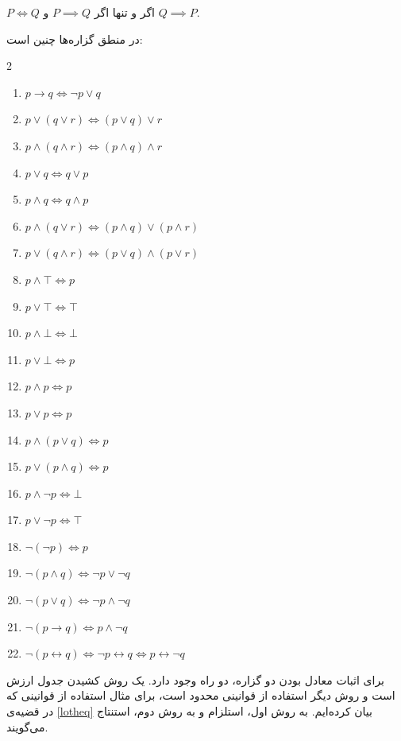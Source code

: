 \begin{theorem}
	$P \iff Q$
	اگر و تنها اگر
	$P \implies Q$ و $Q \implies P$.
\end{theorem}

\begin{theorem} \label{lotheq}
	در منطق گزاره‌ها چنین است:
	\vspace{-0.3cm}
	\begin{multicols}{2}
		\begin{enumerate}
			\item 
			$p \rightarrow q \iff \neg p \vee q$
			\item 
			$p \vee (q \vee r) \iff (p \vee q) \vee r$
			\item 
			$p \wedge (q \wedge r) \iff (p \wedge q) \wedge r$
			\item 
			$p \vee q \iff q \vee p$
			\item 
			$p \wedge q \iff q \wedge p$
			\item 
			$p \wedge (q \vee r) \iff (p \wedge q) \vee (p \wedge r)$
			\item 
			$p \vee (q \wedge r) \iff (p \vee q) \wedge (p \vee r)$
			\item 
			$p \wedge \top \iff p$
			\item 
			$p \vee \top \iff \top$
			\item 
			$p \wedge \bot \iff \bot$
			\item 
			$p \vee \bot \iff p$
			\item 
			$p \wedge p \iff p$
			\item 
			$p \vee p \iff p$
			\item 
			$p \wedge (p \vee q) \iff p$
			\item 
			$p \vee (p \wedge q) \iff p$
			\item 
			$p \wedge \neg p \iff \bot$
			\item 
			$p \vee \neg p \iff \top$
			\item 
			$\neg (\neg p) \iff p$
			\item 
			$\neg (p \wedge q) \iff \neg p \vee \neg q$
			\item 
			$\neg (p \vee q) \iff \neg p \wedge \neg q$
			\item 
			$\neg (p \rightarrow q) \iff p \wedge \neg q$
			\item 
			$\neg (p \leftrightarrow q) \iff \neg p \leftrightarrow q \iff p \leftrightarrow \neg q$
		\end{enumerate}
	\end{multicols}
	\vspace{0.001cm}
\end{theorem}
\smallskip
برای اثبات معادل بودن دو گزاره، دو راه وجود دارد. یک روش کشیدن جدول ارزش است و روش دیگر استفاده از قوانینی محدود است، برای مثال استفاده از قوانینی که در قضیه‌ی
\ref{lotheq}
بیان کرده‌ایم. به روش اول، استلزام و به روش دوم، استنتاج می‌گویند.

